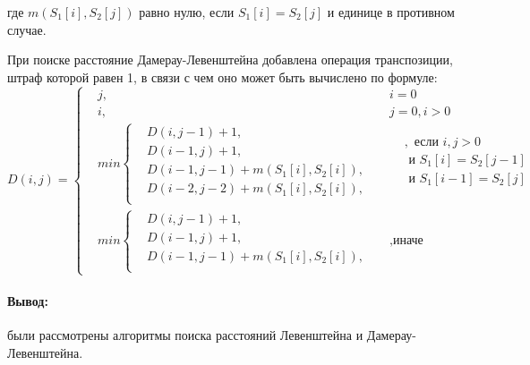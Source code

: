 \begin{flushleft}
	где \(m(S_{1}[i],S_{2}[j])\) равно нулю, если \(S_{1}[i]=S_{2}[j]\) и единице в противном случае.
\end{flushleft}
\par При поиске расстояние Дамерау-Левенштейна добавлена операция транспозиции, штраф которой равен 1, в связи с чем оно может быть вычислено по формуле:
\[ D(i, j) =  \left\{
\begin{aligned}
	&j, && i = 0\\
	&i, && j = 0, i > 0\\		    	
	&min \left\{
	\begin{aligned}
	&D(i, j - 1) + 1,\\
	&D(i - 1, j) + 1,\\
	&D(i - 1, j - 1) + m(S_{1}[i], S_{2}[i]), \\
	&D(i - 2, j - 2) + m(S_{1}[i], S_{2}[i]),\\
	\end{aligned} \right.
	&& 
	\begin{aligned}
	&, \text{ если } i, j > 0 \\
	& \text{ и } S_{1}[i] = S_{2}[j - 1] \\
	& \text{ и } S_{1}[i - 1] =  S_{2}[j] \\
	\end{aligned} \\ 
	&min \left\{
	\begin{aligned}
	&D(i, j - 1) + 1,\\
	&D(i - 1, j) + 1, \\
	&D(i - 1, j - 1) + m(S_{1}[i], S_{2}[i]),\\
	\end{aligned} \right.  &&, \text{иначе}
\end{aligned} \right.
\]
\paragraph{Вывод:} были рассмотрены алгоритмы поиска расстояний Левенштейна и Дамерау-Левенштейна.